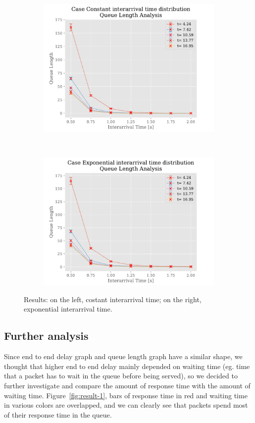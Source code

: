 \documentclass[a4paper,12pt]{article}
\begin{document}
\begin{figure}[H]
\begin{subfigure}[b]{.45\textwidth}
    \includegraphics[width=\textwidth]{img/QueueLengthP2Const.pdf}
    \label{fig:exp:const:queue}
  \end{subfigure}
  ~
  \begin{subfigure}[b]{.45\textwidth}
    \includegraphics[width=\textwidth]{img/QueueLengthP2Exp.pdf}
    \label{fig:exp:exp:queue}
  \end{subfigure}
  \caption{Results: on the left, costant interarrival time; on the right, exponential interarrival time.}
  \label{fig:result-0}
\end{figure}

\subsection{Further analysis}
Since end to end delay graph and queue length graph have a similar shape, we thought that higher end to end delay mainly depended on waiting time (eg. time that a packet has to wait in the queue before being served), so we decided to further investigate and compare the amount of response time with the amount of waiting time.
Figure~\ref{fig:result-1}, bars of response time in red and waiting time in various colors are overlapped, and we can clearly see that packets spend most of their response time in the queue.
\end{document}
